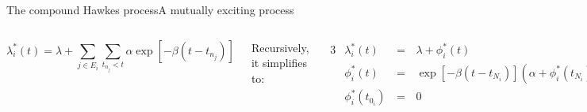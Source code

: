 \documentclass[
  ignorenonframetext,
  aspectratio=169,
  xcolor={dvipsnames,rgb}
]{beamer}
\begin{document}
\begin{frame}[fragile=singleslide]{The compound Hawkes process}{A mutually exciting process}

\vspace{-1em}

\begin{columns}


\[
  \lambda_i^\ast (t) = \lambda + \sum_{j \in E_i} \sum_{t_{n_j} < t} \alpha \exp \left[-\beta (t - t_{n_j}) \right]
\]

Recursively, it simplifies to:

\begin{alignat*}{3}
  &\lambda_i^\ast (t)      & = & \, \lambda + \phi_i^\ast (t) \\
  &\phi_i^\ast (t)         & = & \, \exp \left[ -\beta (t - t_{N_i}) \right] \left( \alpha + \phi_i^\ast (t_{N_i}) \right) \\
  &\phi_i^\ast(t_{0_i}) \, & = & \, 0
\end{alignat*}


\begin{lstlisting}[basicstyle=\scriptsize\ttfamily,escapechar=\#]
function rate(u, p, t)
    #λ#, #α#, #β#, h, urate, #ϕ# = p
    urate[i] = #λ# + exp(-#β# * (t - h[i])) * #ϕ#[i]
    urate[i]
end

function affect(integrator)
    #λ#, #α#, #β#, h, urate, #ϕ# = integrator.p
    for j in g[i]
        #ϕ#[j] *= exp(-#β# * (integrator.t - h[j]))
        #ϕ#[j] += #α#
        h[j] = integrator.t
    end
    integrator.u[i] += 1
end
\end{lstlisting}
  
\end{columns}

\end{frame}
\end{document}
